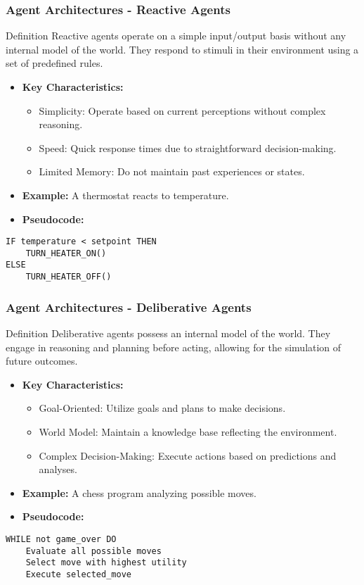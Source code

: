 \documentclass[aspectratio=169]{beamer}
\begin{document}
\begin{frame}[fragile]
  \frametitle{Agent Architectures - Reactive Agents}
  \begin{block}{Definition}
    Reactive agents operate on a simple input/output basis without any internal model of the world. They respond to stimuli in their environment using a set of predefined rules.
  \end{block}
  \begin{itemize}
    \item \textbf{Key Characteristics:}
      \begin{itemize}
        \item Simplicity: Operate based on current perceptions without complex reasoning.
        \item Speed: Quick response times due to straightforward decision-making.
        \item Limited Memory: Do not maintain past experiences or states.
      \end{itemize}
    \item \textbf{Example:} A thermostat reacts to temperature.
    \item \textbf{Pseudocode:}
  \end{itemize}
  \begin{lstlisting}
IF temperature < setpoint THEN
    TURN_HEATER_ON()
ELSE
    TURN_HEATER_OFF()
\end{lstlisting}
\end{frame}

\begin{frame}[fragile]
  \frametitle{Agent Architectures - Deliberative Agents}
  \begin{block}{Definition}
    Deliberative agents possess an internal model of the world. They engage in reasoning and planning before acting, allowing for the simulation of future outcomes.
  \end{block}
  \begin{itemize}
    \item \textbf{Key Characteristics:}
      \begin{itemize}
        \item Goal-Oriented: Utilize goals and plans to make decisions.
        \item World Model: Maintain a knowledge base reflecting the environment.
        \item Complex Decision-Making: Execute actions based on predictions and analyses.
      \end{itemize}
    \item \textbf{Example:} A chess program analyzing possible moves.
    \item \textbf{Pseudocode:}
  \end{itemize}
  \begin{lstlisting}
WHILE not game_over DO
    Evaluate all possible moves
    Select move with highest utility
    Execute selected_move
\end{lstlisting}
\end{frame}
\end{document}
